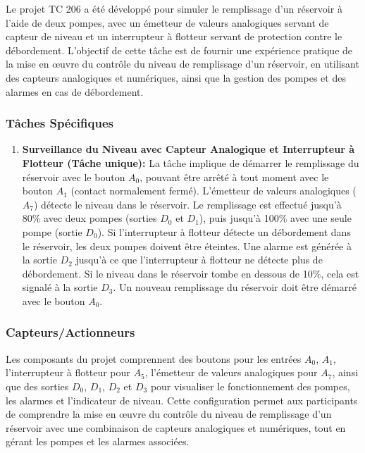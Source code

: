 \documentclass[a4paper,12pt]{report}
\begin{document}
Le projet TC 206 a été développé pour simuler le remplissage d'un réservoir à l'aide de deux pompes, avec un émetteur de valeurs analogiques servant de capteur de niveau et un interrupteur à flotteur servant de protection contre le débordement. L'objectif de cette tâche est de fournir une expérience pratique de la mise en œuvre du contrôle du niveau de remplissage d'un réservoir, en utilisant des capteurs analogiques et numériques, ainsi que la gestion des pompes et des alarmes en cas de débordement.

\subsubsection{Tâches Spécifiques}

\begin{enumerate}
    \item \textbf{Surveillance du Niveau avec Capteur Analogique et Interrupteur à Flotteur (Tâche unique):} La tâche implique de démarrer le remplissage du réservoir avec le bouton \(A_0\), pouvant être arrêté à tout moment avec le bouton \(A_1\) (contact normalement fermé). L'émetteur de valeurs analogiques (\(A_7\)) détecte le niveau dans le réservoir. Le remplissage est effectué jusqu'à 80\% avec deux pompes (sorties \(D_0\) et \(D_1\)), puis jusqu'à 100\% avec une seule pompe (sortie \(D_0\)). Si l'interrupteur à flotteur détecte un débordement dans le réservoir, les deux pompes doivent être éteintes. Une alarme est générée à la sortie \(D_2\) jusqu'à ce que l'interrupteur à flotteur ne détecte plus de débordement. Si le niveau dans le réservoir tombe en dessous de 10\%, cela est signalé à la sortie \(D_3\). Un nouveau remplissage du réservoir doit être démarré avec le bouton \(A_0\).
\end{enumerate}

\subsubsection{Capteurs/Actionneurs}

Les composants du projet comprennent des boutons pour les entrées \(A_0\), \(A_1\), l'interrupteur à flotteur pour \(A_5\), l'émetteur de valeurs analogiques pour \(A_7\), ainsi que des sorties \(D_0\), \(D_1\), \(D_2\) et \(D_3\) pour visualiser le fonctionnement des pompes, les alarmes et l'indicateur de niveau. Cette configuration permet aux participants de comprendre la mise en œuvre du contrôle du niveau de remplissage d'un réservoir avec une combinaison de capteurs analogiques et numériques, tout en gérant les pompes et les alarmes associées.
\end{document}
